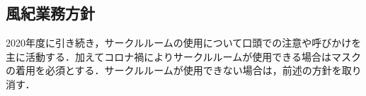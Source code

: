 \subsection*{風紀業務方針}


2020年度に引き続き，サークルルームの使用について口頭での注意や呼びかけを主に活動する．加えてコロナ禍によりサークルルームが使用できる場合はマスクの着用を必須とする．サークルルームが使用できない場合は，前述の方針を取り消す．
